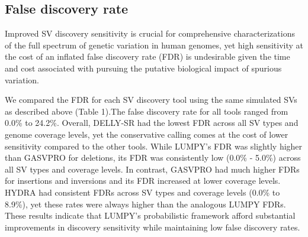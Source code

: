 \documentclass[11pt]{article}
\begin{document}
\subsection{False discovery rate}
Improved SV discovery sensitivity is crucial for comprehensive characterizations
of the full spectrum of genetic variation in human genomes, yet high
sensitivity at the cost of an inflated false discovery rate (FDR) is
undesirable given the time and cost associated with pursuing the putative 
biological impact of spurious variation.

We compared the FDR for each SV discovery tool using the same simulated
SVs as described above (Table 1).The false discovery rate for all tools ranged 
from 0.0\% to 24.2\%. Overall, DELLY-SR had the lowest FDR across all SV types
and genome coverage levels, yet the conservative calling comes at the cost of
lower sensitivity compared to the other tools. While LUMPY's FDR was 
slightly higher than GASVPRO for deletions, its FDR was consistently 
low (0.0\% - 5.0\%) across all SV types and coverage levels. In contrast, 
GASVPRO had much higher FDRs for insertions and inversions and
its FDR increased at lower coverage levels.  HYDRA had consistent FDRs across
SV types and coverage levels (0.0\% to 8.9\%), yet these rates were always 
higher than the analogous LUMPY FDRs. These results indicate that LUMPY's
probabilistic framework afford substantial improvements in discovery
sensitivity while maintaining low false discovery rates.
\end{document}
